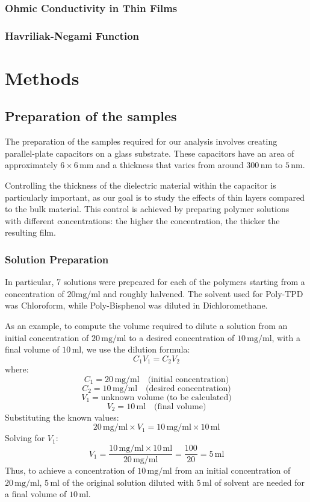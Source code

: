 \subsection{Ohmic Conductivity in Thin Films}
\subsection{Havriliak-Negami Function}

\chapter{Methods}

\section{Preparation of the samples}

The preparation of the samples required for our analysis involves creating parallel-plate capacitors on a glass substrate. These capacitors have an area of approximately \( 6 \times 6 \, \text{mm} \) and a thickness that varies from around \( 300 \, \text{nm} \) to \( 5 \, \text{nm} \).

Controlling the thickness of the dielectric material %
within the capacitor is particularly important, as our goal is to study the effects of thin layers compared to the bulk material. This control is achieved by preparing polymer solutions with different concentrations: the higher the concentration, the thicker the resulting film.
\subsection{Solution Preparation}

In particular, 7 solutions were prepeared for each of the polymers starting from a concentration of $20 \text{mg/ml}$ %
and roughly halvened.
The solvent used for Poly-TPD was Chloroform, while Poly-Bisphenol was diluted in Dichloromethane.

As an example, to compute the volume required to dilute a solution from an initial concentration of \( 20 \, \text{mg/ml} \) to a desired concentration of \( 10 \, \text{mg/ml} \), with a final volume of \( 10 \, \text{ml} \), we use the dilution formula:
\[
C_1 V_1 = C_2 V_2
\]
where:
\[
C_1 = 20 \, \text{mg/ml} \quad \text{(initial concentration)}
\]
\[
C_2 = 10 \, \text{mg/ml} \quad \text{(desired concentration)}
\]
\[
V_1 = \text{unknown volume (to be calculated)}
\]
\[
V_2 = 10 \, \text{ml} \quad \text{(final volume)}
\]
Substituting the known values:
\[
20 \, \text{mg/ml} \times V_1 = 10 \, \text{mg/ml} \times 10 \, \text{ml}
\]
Solving for \( V_1 \):
\[
V_1 = \frac{10 \, \text{mg/ml} \times 10 \, \text{ml}}{20 \, \text{mg/ml}} = \frac{100}{20} = 5 \, \text{ml}
\]
Thus, to achieve a concentration of \( 10 \, \text{mg/ml} \) from an initial concentration of \( 20 \, \text{mg/ml} \), \( 5 \, \text{ml} \) of the original solution diluted with \( 5 \, \text{ml} \) of solvent are needed for a final volume of \( 10 \, \text{ml} \).

